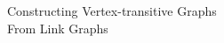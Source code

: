 \documentclass[preview]{standalone}
\begin{document}
\begin{center}
Constructing Vertex-transitive Graphs \\ From Link Graphs
\end{center}
\end{document}
